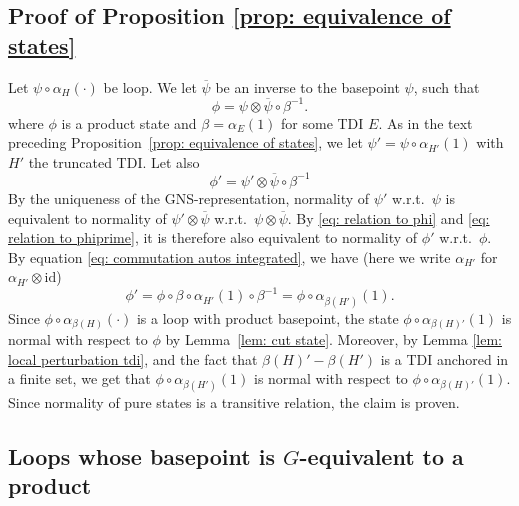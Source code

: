\subsection{Proof of Proposition \ref{prop: equivalence of states}} \label{sec: proof of equivalence propo}
Let $\psi\circ\alpha_H(\cdot)$ be loop. We let $\overline{\psi}$ be an inverse to the basepoint $\psi$, such that
\begin{equation} \label{eq: relation to phi}
	\phi=\psi \otimes \overline{\psi} \circ \beta^{-1}.
\end{equation}
where $\phi$ is a product state and $\beta=\alpha_{E}(1)$ for some TDI $E$.  As in the text preceding Proposition~\ref{prop: equivalence of states}, we let $\psi'=\psi \circ \alpha_{H'}(1)$ with $H'$ the truncated TDI. Let also
\begin{equation} \label{eq: relation to phiprime}
	\phi'= \psi' \otimes \overline{\psi} \circ \beta^{-1}
\end{equation}
By the uniqueness of the GNS-representation, normality of $\psi'$ w.r.t.\ $\psi$ is equivalent to normality of $\psi'\otimes\overline{\psi}$ w.r.t.\  $\psi\otimes\overline{\psi}$. By \eqref{eq: relation to phi} and \eqref{eq: relation to phiprime}, it is therefore also equivalent to normality of $\phi'$ w.r.t.\  $\phi$. By equation \eqref{eq: commutation autos integrated}, we have (here we write $\alpha_{H'}$ for $\alpha_{H'}\otimes \mathrm{id}$)
$$
\phi'= \phi  \circ \beta \circ \alpha_{H'}(1) \circ \beta^{-1} =   \phi  \circ \alpha_{\beta(H')}(1).
$$
Since $\phi  \circ \alpha_{\beta(H)}(\cdot)$ is a loop with product basepoint, the state $\phi  \circ \alpha_{\beta(H)'}(1)$ is normal with respect to $\phi$ by Lemma~\ref{lem: cut state}.  
Moreover, by Lemma \ref{lem: local perturbation tdi}, and the fact that $\beta(H)'-\beta(H')$ is a TDI anchored in a finite set, we get that 
$\phi  \circ \alpha_{\beta(H')}(1) $  is normal with respect to $\phi  \circ \alpha_{\beta(H)'}(1) $.
Since normality of pure states is a transitive relation, the claim is proven. 



\subsection{Loops whose basepoint is $G$-equivalent to a product}\label{sec: loops with equivalent base}

